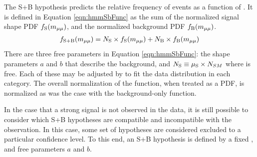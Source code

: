 The S+B hypothesis predicts the relative frequency of events as a function of \muu.
It is defined in Equation \ref{eqn:hmmSbFunc} as the sum of the normalized signal shape PDF $f_\text{S}(m_{\mu\mu})$, and the normalized background PDF $f_\text{B}(m_{\mu\mu})$.
\begin{equation}\begin{split}\label{eqn:hmmSbFunc}
f_\text{S+B}(m_{\mu\mu}) = N_\text{S}\times f_\text{S}(m_{\mu\mu}) + N_\text{B}\times f_\text{B}(m_{\mu\mu})
\end{split}\end{equation} 
There are three free parameters in Equation \ref{eqn:hmmSbFunc}: the shape parameters $a$ and $b$ that describe the background, and $N_\text{S}\equiv\mu_\text{S}\times N_{SM}$ where \mus is free.
Each of these may be adjusted by  to fit the data distribution in each category.
The overall normalization of the function, when treated as a PDF, is normalized as was the case with the background-only function.

In the case that a strong signal is not observed in the data, it is still possible to consider which S+B hypotheses are compatible and incompatible with the observation.
In this case, some set of hypotheses are considered excluded to a particular confidence level.
To this end, an S+B hypothesis is defined by a fixed \mus, and free parameters $a$ and $b$.
